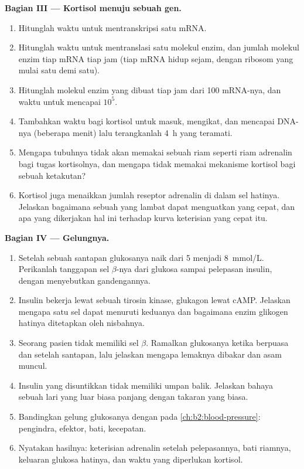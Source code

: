 \begin{problem}
\medskip
\noindent\textbf{Bagian III --- Kortisol menuju sebuah gen.}
\begin{enumerate}[resume]
  \item Hitunglah waktu untuk mentranskripsi satu mRNA.
  \item Hitunglah waktu untuk mentranslasi satu molekul enzim, dan
        jumlah molekul enzim tiap mRNA tiap jam (tiap mRNA hidup
        sejam, dengan ribosom yang mulai satu demi satu).
  \item Hitunglah molekul enzim yang dibuat tiap jam dari \num{100}
        mRNA-nya, dan waktu untuk mencapai $10^{5}$.
  \item Tambahkan waktu bagi kortisol untuk masuk, mengikat, dan
        mencapai DNA-nya (beberapa menit) lalu terangkanlah
        \qty{4}{h} yang teramati.
  \item Mengapa tubuhnya tidak akan memakai sebuah riam seperti
        riam adrenalin bagi tugas kortisolnya, dan mengapa tidak
        memakai mekanisme kortisol bagi sebuah ketakutan?
  \item Kortisol juga menaikkan jumlah reseptor adrenalin di dalam sel
        hatinya. Jelaskan bagaimana sebuah  yang lambat dapat
        menguatkan  yang cepat, dan apa yang dikerjakan hal ini
        terhadap kurva keterisian  yang cepat itu.
\end{enumerate}

\medskip
\noindent\textbf{Bagian IV --- Gelungnya.}
\begin{enumerate}[resume]
  \item Setelah sebuah santapan glukosanya naik dari 5 menjadi
        \qty{8}{mmol/L}. Perikanlah tanggapan sel $\beta$-nya dari
        glukosa sampai pelepasan insulin, dengan menyebutkan
        gandengannya.
  \item Insulin bekerja lewat sebuah tirosin kinase, glukagon lewat
        cAMP. Jelaskan mengapa satu sel dapat menuruti keduanya dan
        bagaimana enzim glikogen hatinya ditetapkan oleh nisbahnya.
  \item Seorang pasien tidak memiliki sel $\beta$. Ramalkan glukosanya
        ketika berpuasa dan setelah santapan, lalu jelaskan mengapa
        lemaknya dibakar dan asam muncul.
  \item Insulin yang disuntikkan tidak memiliki umpan balik. Jelaskan
        bahaya sebuah lari yang luar biasa panjang dengan takaran yang
        biasa.
  \item Bandingkan gelung glukosanya dengan  pada
        \cref{ch:b2:blood-pressure}: pengindra, efektor, bati,
        kecepatan.
  \item Nyatakan hasilnya: keterisian adrenalin setelah pelepasannya,
        bati riamnya, keluaran glukosa hatinya, dan waktu yang
        diperlukan kortisol.
\end{enumerate}
\end{problem}

